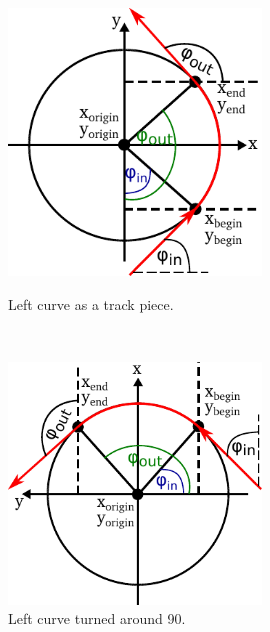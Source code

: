 \begin{figure}
\begin{minipage}{0.45\textwidth}
    \centering
    \includegraphics[width=0.6\textwidth]{LeftCurve}
    \caption{Left curve as a track piece.}
    \label{fig:curve_left}
\end{minipage}
\begin{minipage}{0.1\textwidth}
    \centering
    \phantom{}\ \ 
\end{minipage}
\begin{minipage}{0.45\textwidth}
    \centering
    \includegraphics[width=0.6\textwidth]{LeftCurveRotated}
    \caption{Left curve turned around 90\textdegree.}
    \label{fig:curve_left_rotated}
\end{minipage}
\end{figure}

